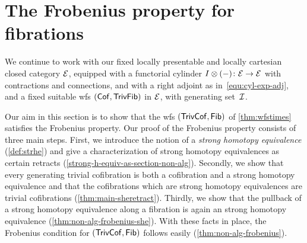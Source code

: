 \documentclass[reqno,10pt,a4paper,oneside,draft]{amsart}
\begin{document}
\section{The Frobenius property for fibrations}
\label{sec:frob}

We continue to work with our fixed locally presentable and locally cartesian closed category $\catE$, equipped with a functorial cylinder $\interval\otimes (-) \co \catE \to \catE$ with contractions and connections, and with a right adjoint as in~\eqref{equ:cyl-exp-adj}, and a fixed suitable wfs $(\Cof, \TrivFib)$ in $\calE$, with generating set~$\cal{I}$.

Our aim in this section is to show that the wfs $(\TrivCof, \Fib)$ of \cref{thm:wfstimes} satisfies the Frobenius property.
Our proof of the Frobenius property consists of three main steps.
First, we introduce the notion of a \emph{strong homotopy equivalence} (\cref{def:strhe}) and give a characterization of strong homotopy equivalences as certain retracts (\cref{strong-h-equiv-as-section-non-alg}).
Secondly, we show that every generating trivial cofibration is both a cofibration and a strong homotopy
equivalence and that the cofibrations which  are strong homotopy equivalences are 
trivial cofibrations (\cref{thm:main-sheretract}).
Thirdly, we show that the pullback of a strong homotopy equivalence along a fibration is again an strong homotopy equivalence (\cref{thm:non-alg-frobenius-she}).
With these facts in place, the Frobenius condition for $(\TrivCof, \Fib)$ follows easily (\cref{thm:non-alg-frobenius}).
\end{document}
